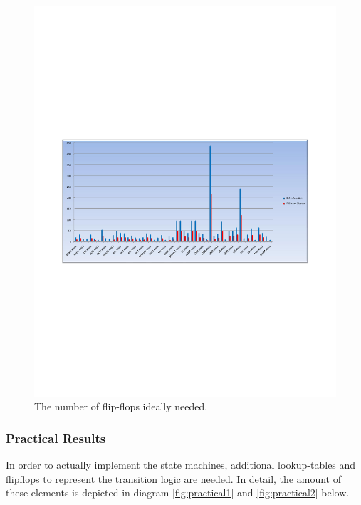 \begin{figure}[h!]
\centering
\includegraphics[scale=1.0, trim=400 280 400 270]{images/output2_ideal_FF.pdf}
\caption{The number of flip-flops ideally needed.}
\label{fig:ideal2}
\end{figure}

\subsubsection{Practical Results}
\label{subsubsec:PResults}

In order to actually implement the state machines, additional lookup-tables and flipflops to represent the transition logic are needed. In detail, the amount of these elements is depicted in diagram \ref{fig:practical1} and \ref{fig:practical2} below.

